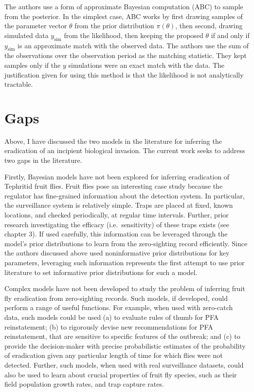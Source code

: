 \documentclass[
  oneside]{book}
\begin{document}
The authors use a form of approximate Bayesian computation (ABC) to sample from the posterior. In the simplest case, ABC works by first drawing samples of the parameter vector \(\theta\) from the prior distribution \(\pi(\theta)\), then second, drawing simulated data \(y_{\text{sim}}\) from the likelihood, then keeping the proposed \(\theta\) if and only if \(y_{\text{sim}}\) is an approximate match with the observed data. The authors use the sum of the observations over the observation period as the matching statistic. They kept samples only if the \(y\) simulations were an exact match with the data. The justification given for using this method is that the likelihood is not analytically tractable.

\hypertarget{gaps}{%
\section{Gaps}\label{gaps}}

Above, I have discussed the two models in the literature for inferring the eradication of an incipient biological invasion. The current work seeks to address two gaps in the literature.

Firstly, Bayesian models have not been explored for inferring eradication of Tephritid fruit flies. Fruit flies pose an interesting case study because the regulator has fine-grained information about the detection system. In particular, the surveillance system is relatively simple. Traps are placed at fixed, known locations, and checked periodically, at regular time intervals. Further, prior research investigating the efficacy (i.e.~sensitivity) of these traps exists (see chapter 3). If used carefully, this information can be leveraged through the model's prior distributions to learn from the zero-sighting record efficiently. Since the authors discussed above used noninformative prior distributions for key parameters, leveraging such information represents the first attempt to use prior literature to set informative prior distributions for such a model.

Complex models have not been developed to study the problem of inferring fruit fly eradication from zero-sighting records. Such models, if developed, could perform a range of useful functions. For example, when used with zero-catch data, such models could be used (a) to evaluate rules of thumb for PFA reinstatement; (b) to rigorously devise new recommendations for PFA reinstatement, that are sensitive to specific features of the outbreak; and (c) to provide the decision-maker with precise probabilistic estimates of the probability of eradication given any particular length of time for which flies were not detected. Further, such models, when used with real surveillance datasets, could also be used to learn about crucial properties of fruit fly species, such as their field population growth rates, and trap capture rates.
\end{document}
